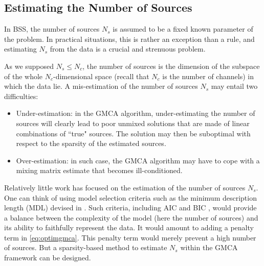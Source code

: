  
\subsection{Estimating the Number of Sources}
In BSS, the number of sources $N_s$ is assumed to be a fixed known parameter of the problem. In practical situations, this is rather an exception than a rule, and estimating $N_s$ from the data is a crucial and strenuous problem. 

As we supposed $N_s \leq N_c$, the number of sources is the dimension of the subspace of the whole $N_c$-dimensional space (recall that $N_c$ is the number of channels) in which the data lie. A mis-estimation of the number of sources $N_s$ may entail two difficulties:
\begin{itemize}
\item{{Under-estimation:}} in the GMCA algorithm, under-estimating the number of sources will clearly lead to poor unmixed solutions that are made of linear combinations of ``true" sources. The solution may then be suboptimal with respect to the sparsity of the estimated sources.
\item{{Over-estimation:}} in such case, the GMCA algorithm may have to cope with a mixing matrix estimate that becomes ill-conditioned.
\end{itemize}
Relatively little work has focused on the estimation of the number of sources $N_s$. One can think of using model selection criteria such as the minimum description length (MDL) devised in \cite{LNCS46660333}. Such criteria, including AIC \citep{akaike} and BIC \citep{schwarz}, would provide a balance between the complexity of the model (here the number of sources) and its ability to faithfully represent the data. It would amount to adding a penalty term in \eqref{eq:optimgmca}. This penalty term would merely prevent a high number of sources. But a sparsity-based method to estimate $N_s$ within the GMCA framework can be designed.

